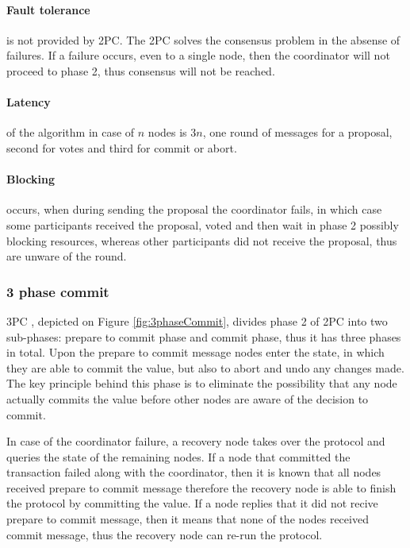 \paragraph{Fault tolerance} is not provided by 2PC. The 2PC solves the consensus problem in the absense of failures. If a failure occurs, even to a single node, then the coordinator will not proceed to phase 2, thus consensus will not be reached.

\paragraph{Latency} of the algorithm in case of $n$ nodes is $3n$, one round of messages for a proposal, second for votes and third for commit or abort.

\paragraph{Blocking} occurs, when during sending the proposal the coordinator fails, in which case some participants received the proposal, voted and then wait in phase 2 possibly blocking resources, whereas other participants did not receive the proposal, thus are unware of the round.





\subsubsection{3 phase commit}\label{sec:theory:transactions:3pc}
3PC \cite{3phaseC}, depicted on Figure \ref{fig:3phaseCommit}, divides phase 2 of 2PC into two sub-phases: prepare to commit phase and commit phase, thus it has three phases in total. Upon the prepare to commit message nodes enter the state, in which they are able to commit the value, but also to abort and undo any changes made. The key principle behind this phase is to eliminate the possibility that any node actually commits the value before other nodes are aware of the decision to commit.

In case of the coordinator failure, a recovery node takes over the protocol and queries the state of the remaining nodes. If a node that committed the transaction failed along with the coordinator, then it is known that all nodes received prepare to commit message therefore the recovery node is able to finish the protocol by committing the value. If a node replies that it did not recive prepare to commit message, then it means that none of the nodes received commit message, thus the recovery node can re-run the protocol. 

